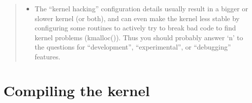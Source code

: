 \documentclass[a4paper,8pt,english]{sphinxmanual}
\begin{document}
\begin{quote}
\begin{itemize}
\begin{itemize}
\item {} 
The ``kernel hacking'' configuration details usually result in a
bigger or slower kernel (or both), and can even make the kernel
less stable by configuring some routines to actively try to
break bad code to find kernel problems (kmalloc()).  Thus you
should probably answer `n' to the questions for ``development'',
``experimental'', or ``debugging'' features.

\end{itemize}

\end{itemize}
\end{quote}


\section{Compiling the kernel}
\end{document}
